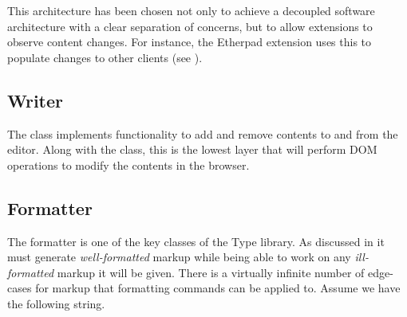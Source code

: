 This architecture has been chosen not only to achieve a decoupled software architecture with a clear separation of concerns, but to allow extensions to observe content changes. For instance, the Etherpad extension uses this to populate changes to other clients (see ).





\subsection{Writer}

The  class implements functionality to add and remove contents to and from the editor. Along with the  class, this is the lowest layer that will perform DOM operations to modify the contents in the browser.


\subsection{Formatter}

The formatter is one of the key classes of the Type library. As discussed in  it must generate \textit{well-formatted} markup while being able to work on any \textit{ill-formatted} markup it will be given. There is a virtually infinite number of edge-cases for markup that formatting commands can be applied to. Assume we have the following string.




